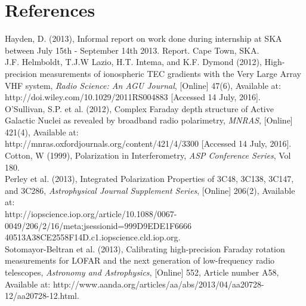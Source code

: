 \documentclass[a4paper,12pt,notitlepage]{article}
\begin{document}
\section{References}

Hayden, D. (2013), Informal report on work done during internship at SKA between July 15th - September 14th 2013. Report. Cape Town, SKA.\\

J.F. Helmboldt, T.J.W Lazio, H.T. Intema, and K.F. Dymond (2012), High-precision measurements of ionospheric TEC gradients with the Very Large Array VHF system, \textit{Radio Science: An AGU Journal}, [Online] 47(6), Available at: http://doi.wiley.com/10.1029/2011RS004883 [Accessed 14 July, 2016]. \\

O'Sullivan, S.P. et al. (2012), Complex Faraday depth structure of Active Galactic Nuclei as revealed by broadband radio polarimetry, \textit{MNRAS}, [Online] 421(4), Available at:\\ http://mnras.oxfordjournals.org/content/421/4/3300 [Accessed 14 July, 2016]. \\

Cotton, W (1999), Polarization in Interferometry, \textit{ASP Conference Series}, Vol 180.\\

Perley et al. (2013), Integrated Polarization Properties of 3C48, 3C138, 3C147, and 3C286, \textit{Astrophysical Journal Supplement Series}, [Online] 206(2), Available at:\\
http://iopscience.iop.org/article/10.1088/0067-0049/206/2/16/meta;jsessionid=999D9EDE1F6666\\
40513A38CE2558F14D.c1.iopscience.cld.iop.org.\\

Sotomayor-Beltran et al. (2013), Calibrating high-precision Faraday rotation measurements for LOFAR and the next generation of low-frequency radio telescopes, \textit{Astronomy and Astrophysics}, [Online] 552, Article number A58, Available at: http://www.aanda.org/articles/aa/abs/2013/04/aa20728-12/aa20728-12.html.
\end{document}

